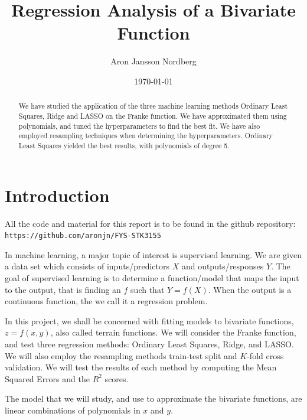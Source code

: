 \documentclass[reprint,english,notitlepage]{revtex4-1}  %
\begin{document}
\title{Regression Analysis of a Bivariate Function}   %
\author{Aron Jansson Nordberg}               %
\date{\today}                             %
\noaffiliation                            %
\begin{abstract}                          %
We have studied the application of the three machine learning methods Ordinary Least Squares, Ridge and LASSO on the Franke function. We have approximated them using polynomials, and tuned the hyperparameters to find the best fit. We have also employed resampling techniques when determining the hyperparameters. Ordinary Least Squares yielded the best results, with polynomials of degree 5.%
\end{abstract}                            %
\maketitle                                %


\section{Introduction}
All the code and material for this report is to be found in the github repository:
\texttt{https://github.com/aronjn/FYS-STK3155}

In machine learning, a major topic of interest is supervised learning. We are given a data set which consists of inputs/predictors $X$ and outputs/responses $Y$. The goal of supervised learning is to determine a function/model that maps the input to the output, that is finding an $f$ such that $Y = f(X)$. When the output is a continuous function, the we call it a regression problem.

In this project, we shall be concerned with fitting models to bivariate functions, $z = f(x, y)$, also called terrain functions. We will consider the Franke function, and test three regression methods: Ordinary Least Squares, Ridge, and LASSO. We will also employ the resampling methods train-test split and $K$-fold cross validation. We will test the results of each method by computing the Mean Squared Errors and the $R^2$ scores.

The model that we will study, and use to approximate the bivariate functions, are linear combinations of polynomials in $x$ and $y$.
\end{document}
